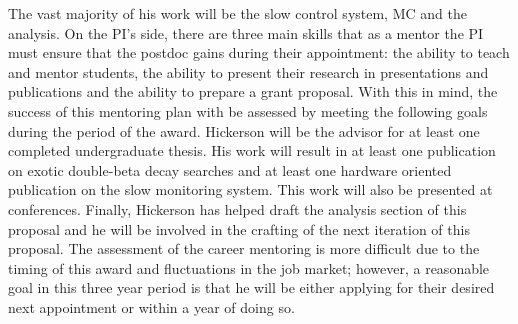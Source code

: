The vast majority of his work will be the slow control system, MC and the analysis. On the PI's side, there are three main skills that as a mentor the PI must  ensure that the postdoc gains during their appointment: the ability to teach and mentor students, the ability to present their research in presentations and publications and the ability to prepare a grant proposal. With this in mind, the success of this mentoring plan with be assessed by meeting the following goals during the period of the award. Hickerson will be the advisor for at least one completed undergraduate thesis. His work will result in at least one publication on exotic double-beta decay searches and at least one hardware oriented publication on the slow monitoring system. This work will also be presented at conferences. Finally, Hickerson has helped draft the analysis section of this proposal and he will be involved in the crafting of the next iteration of this proposal.  The assessment of the career mentoring is more difficult due to the timing of this award and fluctuations in the job market; however, a reasonable goal in this three year period is that he will be either applying for their desired next appointment or within a year of doing so.
 
